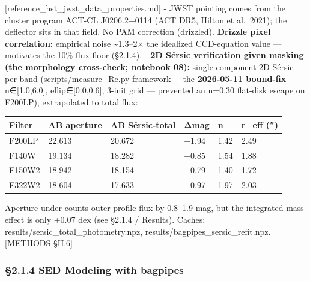 \documentclass[
]{article}
\newcommand{\BreakablePath}[1]{{\ttfamily\sloppy #1}}
\begin{document}
{[}reference\_hst\_jwst\_data\_properties.md{]} - JWST pointing comes
from the cluster program ACT-CL J0206.2−0114 (ACT DR5, Hilton et
al.~2021); the deflector sits in that field. No PAM correction
(drizzled). \textbf{Drizzle pixel correlation:} empirical noise
\textasciitilde1.3--2× the idealized CCD-equation value --- motivates
the 10\% flux floor (§2.1.4). - \textbf{2D Sérsic verification given
masking (the morphology cross-check; notebook 08):} single-component 2D
Sérsic per band
(\BreakablePath{scripts/\discretionary{}{}{}measure\_\discretionary{}{}{}Re.\discretionary{}{}{}py}
framework + the \textbf{2026-05-11 bound-fix} n∈{[}1.0,6.0{]},
ellip∈{[}0.0,0.6{]}, 3-init grid --- prevented an n=0.30 flat-disk
escape on F200LP), extrapolated to total flux:

\begin{longtable}[]{@{}llllll@{}}
\toprule
Filter & AB aperture & AB Sérsic-total & Δmag & n & r\_eff (″) \\
\midrule
\endhead
F200LP & 22.613 & 20.672 & −1.94 & 1.42 & 2.49 \\
F140W & 19.134 & 18.282 & −0.85 & 1.54 & 1.88 \\
F150W2 & 18.942 & 18.154 & −0.79 & 1.40 & 1.72 \\
F322W2 & 18.604 & 17.633 & −0.97 & 1.97 & 2.03 \\
\bottomrule
\end{longtable}

Aperture under-counts outer-profile flux by 0.8--1.9 mag, but the
integrated-mass effect is only +0.07 dex (see §2.1.4 / Results). Caches:
\BreakablePath{results/\discretionary{}{}{}sersic\_\discretionary{}{}{}total\_\discretionary{}{}{}photometry.\discretionary{}{}{}npz},
\BreakablePath{results/\discretionary{}{}{}bagpipes\_\discretionary{}{}{}sersic\_\discretionary{}{}{}refit.\discretionary{}{}{}npz}.
{[}METHODS §II.6{]}

\hypertarget{sed-modeling-with-bagpipes}{%
\subsubsection{\texorpdfstring{§2.1.4 SED Modeling with
\BreakablePath{bagpipes}}{§2.1.4 SED Modeling with }}\label{sed-modeling-with-bagpipes}}
\end{document}
